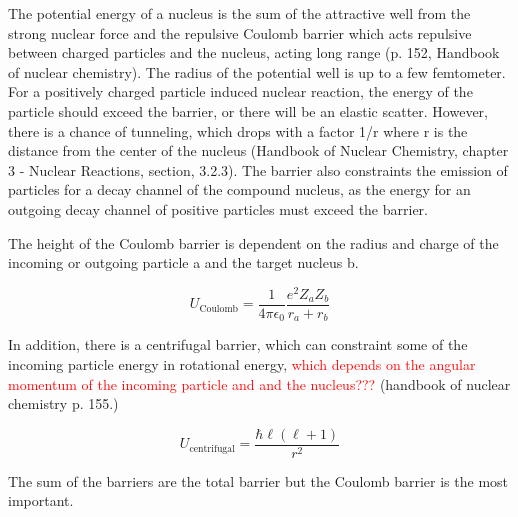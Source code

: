 The potential energy of a nucleus is the sum of the attractive well from the strong nuclear force and the repulsive Coulomb barrier which acts repulsive between charged particles and the nucleus, acting long range (p. 152, Handbook of nuclear chemistry). The radius of the potential well is up to a few femtometer. For a positively charged particle induced nuclear reaction, the energy of the particle should exceed the barrier, or there will be an elastic scatter. However, there is a chance of tunneling, which drops with a factor 1/r where r is the distance from the center of the nucleus (Handbook of Nuclear Chemistry, chapter 3 - Nuclear Reactions, section, 3.2.3). The barrier also constraints the emission of particles for a decay channel of the compound nucleus, as the energy for an outgoing decay channel of positive particles must exceed the barrier. %

The height of the Coulomb barrier is dependent on the radius and charge of the incoming or outgoing particle a and the target nucleus b.

\begin{equation}
    U_\text{Coulomb} = \frac{1}{4\pi \epsilon_0} \frac{e^2Z_a Z_b}{r_a + r_b}
\end{equation}

In addition, there is a centrifugal barrier, which can constraint some of the incoming particle energy in rotational energy, \textcolor{red}{which depends on the angular momentum of the incoming particle and and the nucleus???} (handbook of nuclear chemistry p. 155.)

\begin{equation}
    U_\text{centrifugal} = \frac{\hbar \ell (\ell+1)}{r^2}
\end{equation}

The sum of the barriers are the total barrier but the Coulomb barrier is the most important. 



